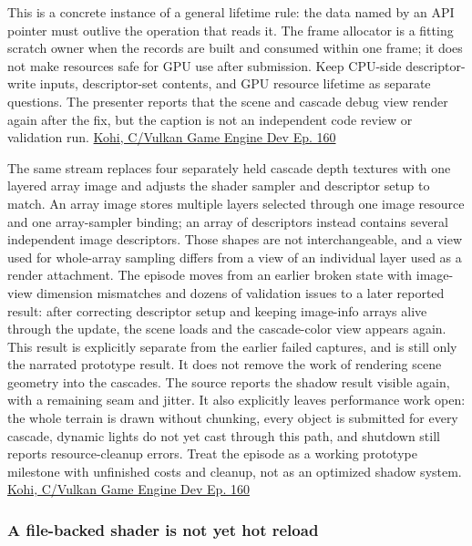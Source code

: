 This is a concrete instance of a general lifetime rule: the data named by an API pointer must outlive the operation that reads it. The frame allocator is a fitting scratch owner when the records are built and consumed within one frame; it does not make resources safe for GPU use after submission. Keep CPU-side descriptor-write inputs, descriptor-set contents, and GPU resource lifetime as separate questions. The presenter reports that the scene and cascade debug view render again after the fix, but the caption is not an independent code review or validation run. \href{https://www.youtube.com/watch?v=Zcxl3BmmxJA}{Kohi, C/Vulkan Game Engine Dev Ep. 160}

The same stream replaces four separately held cascade depth textures with one layered array image and adjusts the shader sampler and descriptor setup to match. An array image stores multiple layers selected through one image resource and one array-sampler binding; an array of descriptors instead contains several independent image descriptors. Those shapes are not interchangeable, and a view used for whole-array sampling differs from a view of an individual layer used as a render attachment. The episode moves from an earlier broken state with image-view dimension mismatches and dozens of validation issues to a later reported result: after correcting descriptor setup and keeping image-info arrays alive through the update, the scene loads and the cascade-color view appears again. This result is explicitly separate from the earlier failed captures, and is still only the narrated prototype result. It does not remove the work of rendering scene geometry into the cascades. The source reports the shadow result visible again, with a remaining seam and jitter. It also explicitly leaves performance work open: the whole terrain is drawn without chunking, every object is submitted for every cascade, dynamic lights do not yet cast through this path, and shutdown still reports resource-cleanup errors. Treat the episode as a working prototype milestone with unfinished costs and cleanup, not as an optimized shadow system. \href{https://www.youtube.com/watch?v=Zcxl3BmmxJA}{Kohi, C/Vulkan Game Engine Dev Ep. 160}

\subsubsection{A file-backed shader is not yet hot reload}\label{06-engine-ii-ch026-a-file-backed-shader-is-not-yet-hot-reload}

\hypertarget{06-engine-ii-ch026-a-file-backed-shader-is-not-yet-hot-reload}{}

